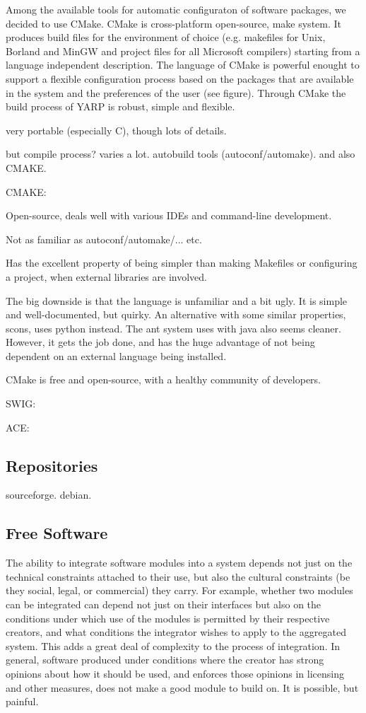 Among the available tools for automatic configuraton of 
software packages, we decided to use CMake. CMake is 
cross-platform open-source, make system. It produces 
build files for the environment of choice (e.g. makefiles
for Unix, Borland and MinGW and project files for all 
Microsoft compilers) starting from a language independent 
description. The language of CMake is powerful enought 
to support a flexible configuration process based 
on the packages that are available in the system and 
the preferences of the user (see figure). Through 
CMake the build process of YARP is robust, simple and 
flexible.

very portable (especially C), though lots of details.

but compile process?  varies a lot. autobuild tools
(autoconf/automake).  and also CMAKE.

CMAKE:

Open-source, deals well with various IDEs and command-line development.

Not as familiar as autoconf/automake/... etc.

Has the excellent property of being simpler than making Makefiles
or configuring a project, when external libraries are involved.

The big downside is that the language is unfamiliar and a bit ugly.
It is simple and well-documented, but quirky.  An alternative with
some similar properties, scons, uses python instead.  The ant system
uses with java also seems cleaner.  However, it gets the job
done, and has the huge advantage of not being dependent on an
external language being installed.

CMake is free and open-source, with a healthy community of 
developers.


SWIG:

ACE:


\subsection{Repositories}

sourceforge.  debian.


\subsection{Free Software}

The ability to integrate software modules into a system
depends not just on the technical constraints attached
to their use, but also the cultural constraints
(be they social, legal, or commercial) they carry.
%
For example, whether two modules can be integrated
can depend not just on their interfaces but also on
the conditions under which use of the modules
is permitted by their respective creators,
and what conditions the integrator wishes to 
apply to the aggregated system.  
%
This adds a great deal of complexity to the process
of integration.
%
In general, software produced under conditions where the 
creator has strong opinions about how it should be 
used, and enforces those opinions in licensing
and other measures, does not make a good module 
to build on.
%
It is possible, but painful.

